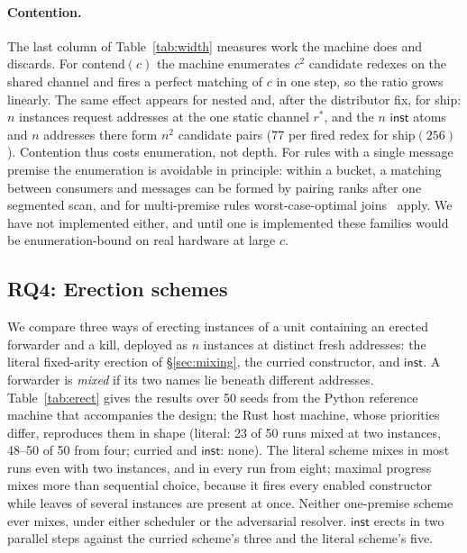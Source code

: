 \documentclass[acmsmall,screen,review,anonymous]{acmart}
\newcommand{\inst}{\mathsf{inst}}
\begin{document}
\paragraph{Contention.} The last column of Table~\ref{tab:width} measures
work the machine does and discards. For contend$(c)$ the machine enumerates
$c^{2}$ candidate redexes on the shared channel and fires a perfect matching of
$c$ in one step, so the ratio grows linearly. The same effect appears for
nested and, after the distributor fix, for ship: $n$ instances request
addresses at the one static channel $r^{*}$, and the $n$ $\inst$ atoms and $n$
addresses there form $n^{2}$ candidate pairs (77 per fired redex for
ship$(256)$). Contention thus costs enumeration, not depth. For rules with a
single message premise the enumeration is avoidable in principle: within a
bucket, a matching between consumers and messages can be formed by pairing
ranks after one segmented scan, and for multi-premise rules worst-case-optimal
joins~\cite{Ngo18} apply. We have not implemented either, and until one is
implemented these families would be enumeration-bound on real hardware at
large $c$.

\subsection{RQ4: Erection schemes}
\label{sec:eval-erection}

We compare three ways of erecting instances of a unit containing an erected
forwarder and a kill, deployed as $n$ instances at distinct fresh addresses:
the literal fixed-arity erection of \S\ref{sec:mixing}, the curried
constructor, and $\inst$. A forwarder is \emph{mixed} if its two names lie
beneath different addresses. Table~\ref{tab:erect} gives the results over 50
seeds from the Python reference machine that accompanies the design; the Rust
host machine, whose priorities differ, reproduces them in shape (literal: 23
of 50 runs mixed at two instances, 48--50 of 50 from four; curried and
$\inst$: none). The literal scheme mixes in most runs even with two instances, and in
every run from eight; maximal progress mixes more than sequential choice,
because it fires every enabled constructor while leaves of several instances
are present at once. Neither one-premise scheme ever mixes, under either
scheduler or the adversarial resolver. $\inst$ erects in two parallel steps
against the curried scheme's three and the literal scheme's five.
\end{document}
